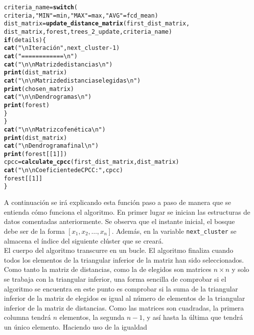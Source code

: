 \documentclass[12pt]{report}\usepackage[]{graphicx}\usepackage[dvipsnames]{xcolor}
\makeatletter
\newcommand{\hlnum}[1]{\textcolor[rgb]{0.686,0.059,0.569}{#1}}%
\newcommand{\hlstr}[1]{\textcolor[rgb]{0.192,0.494,0.8}{#1}}%
\newcommand{\hlopt}[1]{\textcolor[rgb]{0,0,0}{#1}}%
\newcommand{\hlstd}[1]{\textcolor[rgb]{0.345,0.345,0.345}{#1}}%
\newcommand{\hlkwa}[1]{\textcolor[rgb]{0.161,0.373,0.58}{\textbf{#1}}}%
\newcommand{\hlkwb}[1]{\textcolor[rgb]{0.69,0.353,0.396}{#1}}%
\newcommand{\hlkwd}[1]{\textcolor[rgb]{0.737,0.353,0.396}{\textbf{#1}}}%
\newenvironment{kframe}{%
 \def\at@end@of@kframe{}%
 \ifinner\ifhmode%
  \def\at@end@of@kframe{\end{minipage}}%
  \begin{minipage}{\columnwidth}%
 \fi\fi%
 \def\FrameCommand##1{\hskip\@totalleftmargin \hskip-\fboxsep
 \colorbox{shadecolor}{##1}\hskip-\fboxsep
     \hskip-\linewidth \hskip-\@totalleftmargin \hskip\columnwidth}%
 \MakeFramed {\advance\hsize-\width
   \@totalleftmargin\z@ \linewidth\hsize
   \@setminipage}}%
 {\par\unskip\endMakeFramed%
 \at@end@of@kframe}
\newenvironment{knitrout}{}{} %
\makeatother
\begin{document}
\begin{knitrout}
\begin{kframe}
\begin{alltt}
                \hlstd{criteria_name} \hlkwb{=} \hlkwd{switch}\hlstd{(}
                        \hlstd{criteria,} \hlstr{"MIN"} \hlstd{= min,} \hlstr{"MAX"} \hlstd{= max,} \hlstr{"AVG"} \hlstd{= fcd_mean)}
                \hlstd{dist_matrix} \hlkwb{=} \hlkwd{update_distance_matrix}\hlstd{(first_dist_matrix,}
                        \hlstd{dist_matrix, forest, trees_2_update, criteria_name)}
                \hlkwa{if} \hlstd{(details) \{}
                        \hlkwd{cat}\hlstd{(}\hlstr{"\textbackslash{}nIteración"}\hlstd{, next_cluster} \hlopt{-} \hlnum{1}\hlstd{)}
                        \hlkwd{cat}\hlstd{(}\hlstr{"============\textbackslash{}n"}\hlstd{)}
                        \hlkwd{cat}\hlstd{(}\hlstr{"\textbackslash{}n\textbackslash{}nMatriz de distancias\textbackslash{}n"}\hlstd{)}
                        \hlkwd{print}\hlstd{(dist_matrix)}
                        \hlkwd{cat}\hlstd{(}\hlstr{"\textbackslash{}n\textbackslash{}nMatriz de distancias elegidas\textbackslash{}n"}\hlstd{)}
                        \hlkwd{print}\hlstd{(chosen_matrix)}
                        \hlkwd{cat}\hlstd{(}\hlstr{"\textbackslash{}n\textbackslash{}nDendrogramas\textbackslash{}n"}\hlstd{)}
                        \hlkwd{print}\hlstd{(forest)}
                \hlstd{\}}
        \hlstd{\}}
        \hlkwd{cat}\hlstd{(}\hlstr{"\textbackslash{}n\textbackslash{}nMatriz cofenética\textbackslash{}n"}\hlstd{)}
        \hlkwd{print}\hlstd{(dist_matrix)}
        \hlkwd{cat}\hlstd{(}\hlstr{"\textbackslash{}nDendrograma final\textbackslash{}n"}\hlstd{)}
        \hlkwd{print}\hlstd{(forest[[}\hlnum{1}\hlstd{]])}
        \hlstd{cpcc} \hlkwb{=} \hlkwd{calculate_cpcc}\hlstd{(first_dist_matrix, dist_matrix)}
        \hlkwd{cat}\hlstd{(}\hlstr{"\textbackslash{}n\textbackslash{}nCoeficiente de CPCC: "}\hlstd{, cpcc)}
        \hlstd{forest[[}\hlnum{1}\hlstd{]]}
\hlstd{\}}
\end{alltt}
\end{kframe}
\end{knitrout}
		 		
		 		A continuación se irá explicando esta función paso a paso  de manera que se entienda cómo funciona el algoritmo. En primer lugar se inician las estructuras de datos comentadas anteriormente. Se observa que el instante inicial, el bosque debe ser de la forma $[x_1, x_2, \hdots, x_n]$. Además, en la variable \texttt{next\_cluster} se almacena el índice del siguiente clúster que se creará. \\
		 		
		 		El cuerpo del algoritmo transcurre en un bucle. El algoritmo finaliza cuando todos los elementos de la triangular inferior de la matriz han sido seleccionados. Como tanto la matriz de distancias, como la de elegidos son matrices $n \times n$ y solo se trabaja con la triangular inferior, una forma sencilla de comprobar si el algoritmo se encuentra en este punto es comprobar si la suma de la triangular inferior de la matriz de elegidos es igual al número de elementos de la triangular inferior de la matriz de distancias. Como las matrices son cuadradas, la primera columna tendrá $n$ elementos, la segunda $n-1$, y así hasta la última que tendrá un único elemento. Haciendo uso de la igualdad
		 		
\end{document}
